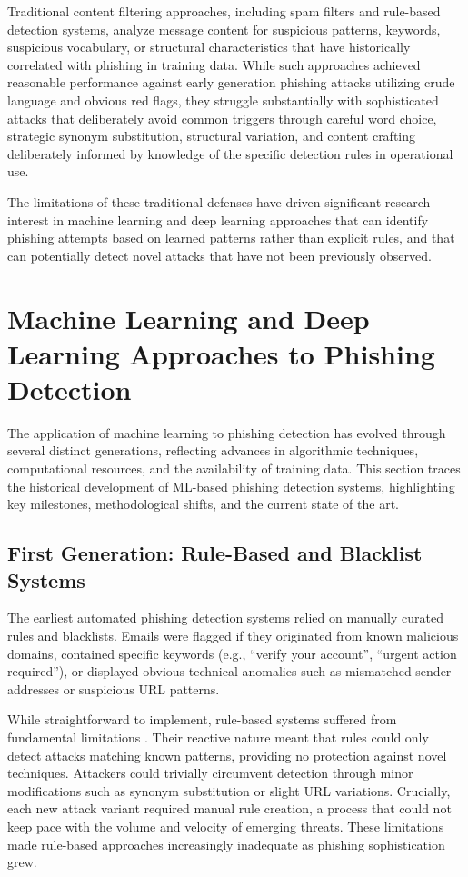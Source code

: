 Traditional content filtering approaches, including spam filters and rule-based detection systems, analyze message content for suspicious patterns, keywords, suspicious vocabulary, or structural characteristics that have historically correlated with phishing in training data. While such approaches achieved reasonable performance against early generation phishing attacks utilizing crude language and obvious red flags, they struggle substantially with sophisticated attacks that deliberately avoid common triggers through careful word choice, strategic synonym substitution, structural variation, and content crafting deliberately informed by knowledge of the specific detection rules in operational use.

The limitations of these traditional defenses have driven significant research interest in machine learning and deep learning approaches that can identify phishing attempts based on learned patterns rather than explicit rules, and that can potentially detect novel attacks that have not been previously observed.

\section{Machine Learning and Deep Learning Approaches to Phishing Detection}

The application of machine learning to phishing detection has evolved through several distinct generations, reflecting advances in algorithmic techniques, computational resources, and the availability of training data. This section traces the historical development of ML-based phishing detection systems, highlighting key milestones, methodological shifts, and the current state of the art.

\subsection{First Generation: Rule-Based and Blacklist Systems}

The earliest automated phishing detection systems relied on manually curated rules and blacklists. Emails were flagged if they originated from known malicious domains, contained specific keywords (e.g., ``verify your account'', ``urgent action required''), or displayed obvious technical anomalies such as mismatched sender addresses or suspicious URL patterns.

While straightforward to implement, rule-based systems suffered from fundamental limitations \cite{abu2007survey,hong2012state}. Their reactive nature meant that rules could only detect attacks matching known patterns, providing no protection against novel techniques. Attackers could trivially circumvent detection through minor modifications such as synonym substitution or slight URL variations. Crucially, each new attack variant required manual rule creation, a process that could not keep pace with the volume and velocity of emerging threats. These limitations made rule-based approaches increasingly inadequate as phishing sophistication grew.

